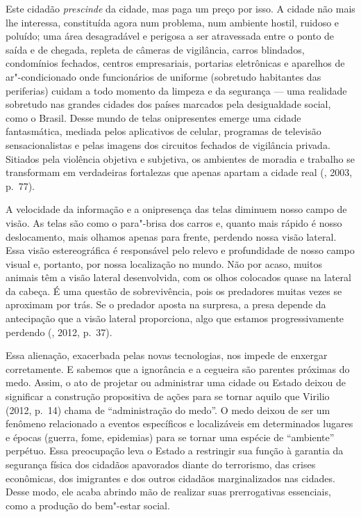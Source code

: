 Este cidadão \emph{prescinde} da cidade, mas paga um preço por isso. A cidade não mais lhe interessa, constituída agora num problema, num ambiente hostil, ruidoso e poluído; uma área desagradável e perigosa a ser atravessada entre o ponto de saída e de chegada, repleta de câmeras de vigilância, carros
blindados, condomínios fechados, centros empresariais, portarias
eletrônicas e aparelhos de ar"-condicionado onde funcionários de uniforme
(sobretudo habitantes das periferias) cuidam a todo momento da limpeza e
da segurança --- uma realidade sobretudo nas grandes cidades dos países
marcados pela desigualdade social, como o Brasil. Desse mundo de telas
onipresentes emerge uma cidade fantasmática, mediada pelos aplicativos
de celular, programas de televisão sensacionalistas e pelas imagens dos
circuitos fechados de vigilância privada. Sitiados pela violência
objetiva e subjetiva, os ambientes de moradia e trabalho se transformam
em verdadeiras fortalezas que apenas apartam a cidade real (,
2003, p.~77).

A velocidade da informação e a onipresença das telas diminuem nosso
campo de visão. As telas são como o para"-brisa dos carros e, quanto mais
rápido é nosso deslocamento, mais olhamos apenas para frente, perdendo
nossa visão lateral. Essa visão estereográfica é responsável pelo relevo
e profundidade de nosso campo visual e, portanto, por nossa localização
no mundo. Não por acaso, muitos animais têm a visão lateral
desenvolvida, com os olhos colocados quase na lateral da cabeça. É uma
questão de sobrevivência, pois os predadores muitas vezes se aproximam
por trás. Se o predador aposta na surpresa, a presa depende da
antecipação que a visão lateral proporciona, algo que estamos
progressivamente perdendo (, 2012, p.~37).

Essa alienação, exacerbada pelas novas tecnologias, nos impede de
enxergar corretamente. E sabemos que a ignorância e a cegueira são
parentes próximas do medo. Assim, o ato de projetar ou administrar uma
cidade ou Estado deixou de significar a construção propositiva de ações
para se tornar aquilo que Virilio (2012, p.~14) chama de ``administração
do medo''. O medo deixou de ser um fenômeno relacionado a eventos
específicos e localizáveis em determinados lugares e épocas (guerra,
fome, epidemias) para se tornar uma espécie de ``ambiente'' perpétuo.
Essa preocupação leva o Estado a restringir sua função à garantia da
segurança física dos cidadãos apavorados diante do terrorismo, das
crises econômicas, dos imigrantes e dos outros cidadãos marginalizados
nas cidades. Desse modo, ele acaba abrindo mão de realizar suas
prerrogativas essenciais, como a produção do bem"-estar social.

